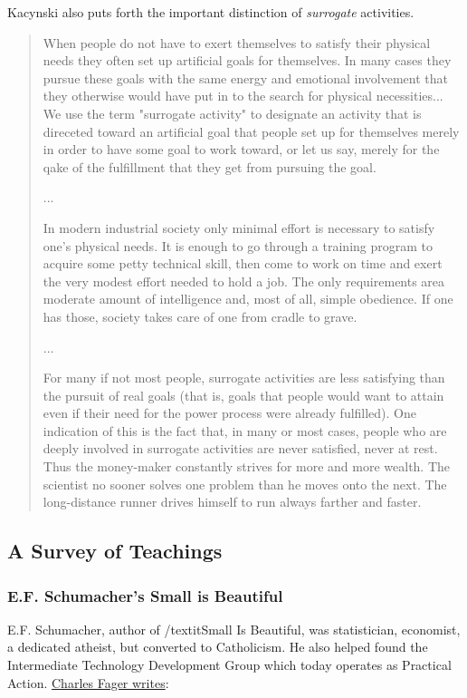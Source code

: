 \documentclass[letterpaper]{article}
\begin{document}
Kacynski also puts forth the important distinction of \textit{surrogate} activities.

\begin{quote}
When people do not have to exert themselves to satisfy their physical needs they often set up artificial goals for themselves. In many cases they pursue these goals with the same energy and emotional involvement that they otherwise would have put in to the search for physical necessities... We use the term "surrogate activity" to designate an activity that is direceted toward an artificial goal that people set up for themselves merely in order to have some goal to work toward, or let us say, merely for the qake of the fulfillment that they get from pursuing the goal.

...

In modern industrial society only minimal effort is necessary to satisfy one's physical needs. It is enough to go through a training program to acquire some petty technical skill, then come to work on time and exert the very modest effort needed to hold a job. The only requirements area moderate amount of intelligence and, most of all, simple obedience. If one has those, society takes care of one from cradle to grave.

...

For many if not most people, surrogate activities are less satisfying than the pursuit of real goals (that is, goals that people would want to attain even if their need for the power process were already fulfilled). One indication of this is the fact that, in many or most cases, people who are deeply involved in surrogate activities are never satisfied, never at rest. Thus the money-maker constantly strives for more and more wealth. The scientist no sooner solves one problem than he moves onto the next. The long-distance runner drives himself to run always farther and faster.
\end{quote}

\fi

\subsection{A Survey of Teachings}

\subsubsection{E.F. Schumacher's Small is Beautiful}

E.F. Schumacher, author of /textit{Small Is Beautiful}, was statistician, economist, a dedicated atheist, but converted to Catholicism. He also helped found the Intermediate Technology Development Group which today operates as Practical Action. \href{https://www.religion-online.org/article/small-is-beautiful-and-so-is-rome-surprising-faith-of-e-f-schumacher/}{Charles Fager writes}:
\end{document}
